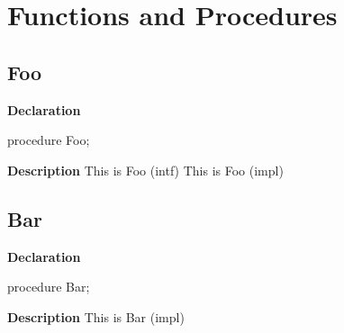 \documentclass{report}
\begin{document}
\section{Functions and Procedures}
\subsection*{Foo}
\begin{list}{}{
\setlength{\itemindent}{0cm}
\setlength{\listparindent}{0cm}
\setlength{\leftmargin}{\evensidemargin}
\addtolength{\leftmargin}{\tmplength}
\settowidth{\labelsep}{X}
\addtolength{\leftmargin}{\labelsep}
\setlength{\labelwidth}{\tmplength}
}
\begin{flushleft}
\item[\textbf{Declaration}\hfill]
\begin{ttfamily}
procedure Foo;\end{ttfamily}


\end{flushleft}
\par
\item[\textbf{Description}]
This is Foo (intf) This is Foo (impl)

\end{list}
\subsection*{Bar}
\begin{list}{}{
\setlength{\itemindent}{0cm}
\setlength{\listparindent}{0cm}
\setlength{\leftmargin}{\evensidemargin}
\addtolength{\leftmargin}{\tmplength}
\settowidth{\labelsep}{X}
\addtolength{\leftmargin}{\labelsep}
\setlength{\labelwidth}{\tmplength}
}
\begin{flushleft}
\item[\textbf{Declaration}\hfill]
\begin{ttfamily}
procedure Bar;\end{ttfamily}


\end{flushleft}
\par
\item[\textbf{Description}]
This is Bar (impl)

\end{list}
\end{document}
